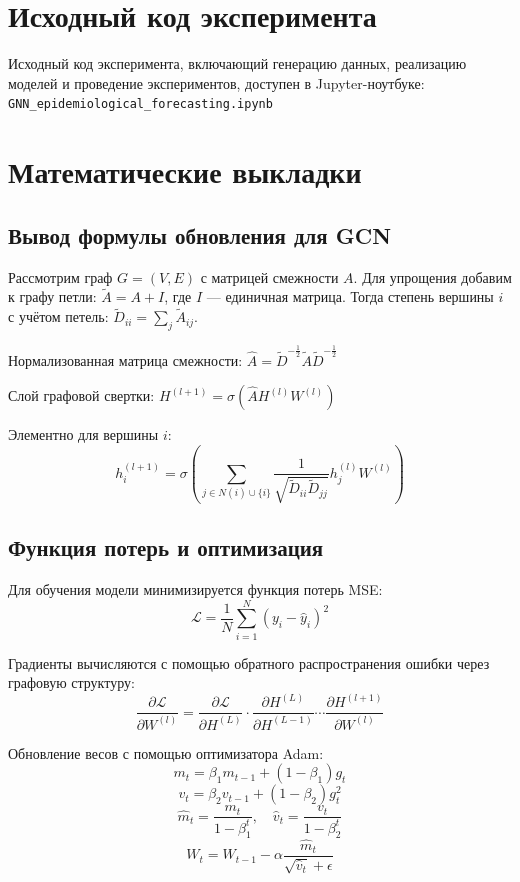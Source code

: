 \documentclass[12pt,a4paper]{article}
\begin{document}
	\appendix
	\section{Исходный код эксперимента}
	Исходный код эксперимента, включающий генерацию данных, реализацию моделей и проведение экспериментов, доступен в Jupyter-ноутбуке: \texttt{GNN\_epidemiological\_forecasting.ipynb}
	
	\section{Математические выкладки}
	\subsection{Вывод формулы обновления для GCN}
	Рассмотрим граф $G = (V, E)$ с матрицей смежности $A$. Для упрощения добавим к графу петли: $\tilde{A} = A + I$, где $I$ — единичная матрица. Тогда степень вершины $i$ с учётом петель: $\tilde{D}_{ii} = \sum_j \tilde{A}_{ij}$.
	
	Нормализованная матрица смежности: $\hat{A} = \tilde{D}^{-\frac{1}{2}}\tilde{A}\tilde{D}^{-\frac{1}{2}}$
	
	Слой графовой свертки: $H^{(l+1)} = \sigma(\hat{A}H^{(l)}W^{(l)})$
	
	Элементно для вершины $i$:
	$$ h_i^{(l+1)} = \sigma\left(\sum_{j \in N(i) \cup \{i\}} \frac{1}{\sqrt{\tilde{D}_{ii}\tilde{D}_{jj}}} h_j^{(l)} W^{(l)}\right) $$
	
	\subsection{Функция потерь и оптимизация}
	Для обучения модели минимизируется функция потерь MSE:
	$$ \mathcal{L} = \frac{1}{N} \sum_{i=1}^{N} (y_i - \hat{y}_i)^2 $$
	
	Градиенты вычисляются с помощью обратного распространения ошибки через графовую структуру:
	$$ \frac{\partial \mathcal{L}}{\partial W^{(l)}} = \frac{\partial \mathcal{L}}{\partial H^{(L)}} \cdot \frac{\partial H^{(L)}}{\partial H^{(L-1)}} \cdots \frac{\partial H^{(l+1)}}{\partial W^{(l)}} $$
	
	Обновление весов с помощью оптимизатора Adam:
	$$ m_t = \beta_1 m_{t-1} + (1 - \beta_1) g_t $$
	$$ v_t = \beta_2 v_{t-1} + (1 - \beta_2) g_t^2 $$
	$$ \hat{m}_t = \frac{m_t}{1 - \beta_1^t}, \quad \hat{v}_t = \frac{v_t}{1 - \beta_2^t} $$
	$$ W_t = W_{t-1} - \alpha \frac{\hat{m}_t}{\sqrt{\hat{v}_t} + \epsilon} $$
	
\end{document}
